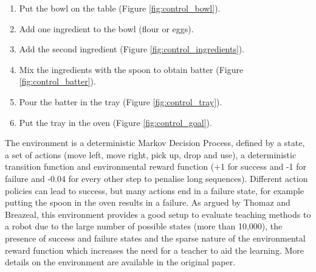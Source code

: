 \begin{enumerate}
	\item Put the bowl on the table (Figure \ref{fig:control_bowl}).
	\item Add one ingredient to the bowl (flour or eggs).
	\item Add the second ingredient (Figure \ref{fig:control_ingredients}).
	\item Mix the ingredients with the spoon to obtain batter (Figure \ref{fig:control_batter}).
	\item Pour the batter in the tray (Figure \ref{fig:control_tray}).
	\item Put the tray in the oven (Figure \ref{fig:control_goal}).
\end{enumerate}

The environment is a deterministic Markov Decision Process, defined by a state, a set of actions (move left, move right, pick up, drop and use), a deterministic transition function and environmental reward function (+1 for success and -1 for failure and -0.04 for every other step to penalise long sequences). Different action policies can lead to success, but many actions end in a failure state, for example putting the spoon in the oven results in a failure. As argued by Thomaz and Breazeal, this environment provides a good setup to evaluate teaching methods to a robot due to the large number of possible states (more than 10,000), the presence of success and failure states and the sparse nature of the environmental reward function which increases the need for a teacher to aid the learning. More details on the environment are available in the original paper.

